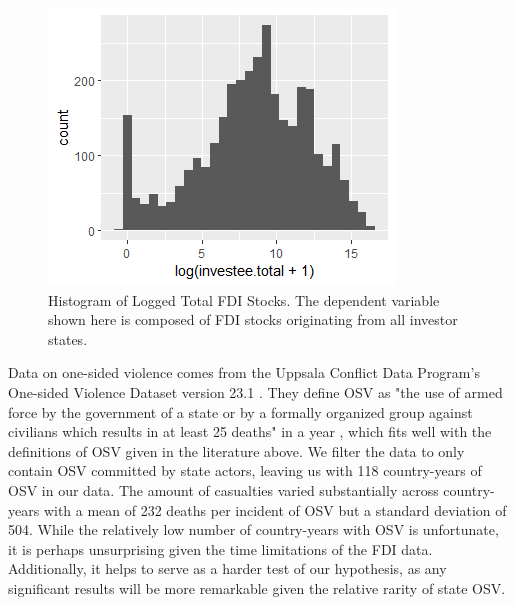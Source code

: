 \documentclass[11pt, titlepage]{article} %
\begin{document}
	\begin{figure}
 \centering
		\includegraphics[scale=1]{dv4histo.png}
		\caption{Histogram of Logged Total FDI Stocks. The dependent variable shown here is composed of FDI stocks originating from all investor states.}
		\label{dv4histo}
	\end{figure}

Data on one-sided violence comes from the Uppsala Conflict Data Program’s One-sided Violence Dataset version 23.1 \parencite{eck2007one,davies2023organized}. They define OSV as "the use of armed force by the government of a state or by a formally organized group against civilians which results in at least 25 deaths" in a year \parencite{pettersson2023codebook}, which fits well with the definitions of OSV given in the literature above. We filter the data to only contain OSV committed by state actors, leaving us with 118 country-years of OSV in our data. The amount of casualties varied substantially across country-years with a mean of 232 deaths per incident of OSV but a standard deviation of 504. While the relatively low number of country-years with OSV is unfortunate, it is perhaps unsurprising given the time limitations of the FDI data. Additionally, it helps to serve as a harder test of our hypothesis, as any significant results will be more remarkable given the relative rarity of state OSV.
\end{document}
